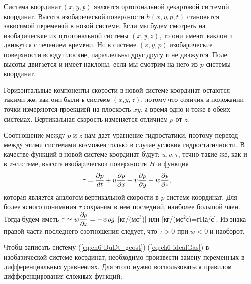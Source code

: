     Система координат $(x,y,p)$ является ортогональной декартовой системой координат. Высота изобарической поверхности $h(x,y,p,t)$ становится зависимой переменой в новой системе. Если мы будем смотреть на изобарические их ортогональной системы $(x,y,z)$, то они имеют наклон и движутся с течением времени. Но в системе $(x,y,p)$ изобарические поверхности всюду плоские, параллельны друг другу и не движутся. Поле высоты двигается и имеет наклоны, если мы смотрим на него из $p$-системы координат. 

    Горизонтальные компоненты скорости в новой системе координат остаются такими же, как они были в системе $(x,y,z)$, потому что отличия в положении точки измеряются проекцией на плоскость $xy$, а время одно и тоже в обеих системах. Вертикальная скорость изменяется отличием $p$ от $z$.

    Соотношение между $p$ и $z$ нам дает уравнение гидростатики, поэтому переход между этими системами возможен только в случае условия гидростатичности. В качестве функций в новой системе координат будут: $u,v,\tau$, точно такие же, как и в $z$-системе, высота изобарической поверхности $H$ и функция 
    \begin{equation}
        \label{eq:tau}
        \tau=\displaystyle\frac{\partial p}{dt}+ u\frac{\partial p}{\partial x}+v\frac{\partial p}{\partial y}+w\frac{\partial p}{\partial z},
    \end{equation}
    которая является аналогом вертикальной скорости в $p$-системе координат. Для более ясного понимания $\tau$ сохраним в нем последний, наиболее большой член. Тогда будем иметь $\tau\simeq w\displaystyle\frac{\partial p}{\partial z}=-w\rho g$ [кг/(мс$^3$)] или [кг/(мс$^2$с)=гПа/с]. Из знака правой части последнего соотношения следует, что $\tau>0$ при $w<0$ и наоборот.

    Чтобы записать систему (\ref{eq:ch6-DuDt_geost})-(\ref{eq:ch6-idealGas}) в изобарической системе координат, необходимо произвести замену переменных в дифференциальных уравнениях. Для этого нужно воспользоваться правилом дифференцирования сложных функций:

